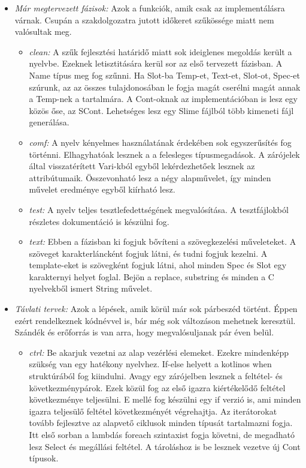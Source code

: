 {\begin{itemize}
\item \emph{Már megtervezett fázisok:}
Azok a funkciók, amik csak az implementálásra várnak.
Csupán a szakdolgozatra jutott időkeret szűkössége miatt nem valósultak meg.
\begin{itemize}
\item \emph{clean:}
A szűk fejlesztési határidő miatt sok ideiglenes megoldás került a nyelvbe.
Ezeknek letisztitására kerül sor az első tervezett fázisban.
A Name típus meg fog szűnni.
Ha Slot-ba Temp-et, Text-et, Slot-ot, Spec-et szúrunk, az az összes tulajdonosában le fogja magát cserélni magát annak a Temp-nek a tartalmára.
A Cont-oknak az implementációban is lesz egy közös őse, az SCont.
Lehetséges lesz egy Slime fájlból több kimeneti fájl generálása.
\item \emph{comf:}
A nyelv kényelmes használatának érdekében sok egyszerűsítés fog történni.
Elhagyhatóak lesznek a a felesleges típusmegadások.
A zárójelek által visszatérített Vari-kból egyből lekérdezhetőek lesznek az attribútumaik. 
Összevonható lesz a négy alapművelet, így minden művelet eredménye egyből kiírható lesz.
\item \emph{test:}
A nyelv teljes tesztlefedettségének megvalósítása.
A tesztfájlokból részletes dokumentáció is készülni fog.
\item \emph{text:}
Ebben a fázisban ki fogjuk bővíteni a szövegkezelési műveleteket.
A szöveget karakterláncként fogjuk látni, és tudni fogjuk kezelni.
A template-eket is szövegként fogjuk látni, ahol minden Spec és Slot egy karakternyi helyet foglal.
Bejön a replace, substring és minden a C nyelvekből ismert String művelet.
\end{itemize}

\item \emph{Távlati tervek:}
Azok a lépések, amik körül már sok párbeszéd történt.
Éppen ezért rendelkeznek kódnévvel is, bár még sok változáson mehetnek keresztül.
Szándék és erőforrás is van arra, hogy megvalósuljanak pár éven belül.

\begin{itemize}
\item \emph{ctrl:}
Be akarjuk vezetni az alap vezérlési elemeket.
Ezekre mindenképp szükség van egy hatékony nyelvhez.
If-else helyett a kotlinos when struktúrából fog kiindulni.
Avagy egy zárójelben lesznek a feltétel- és következménypárok.
Ezek közül fog az első igazra kiértékelődő feltétel következménye teljesülni.
E mellé fog készülni egy if verzió is, ami minden igazra teljesülő feltétel következményét végrehajtja.
Az iterátorokat tovább fejlesztve az alapvető ciklusok minden típusát tartalmazni fogja.
Itt első sorban a lambdás foreach szintaxist fogja követni, de megadható lesz Select és megállási feltétel.
A tároláshoz is be lesznek vezetve új Cont típusok.


\end{itemize}
\end{itemize}}

